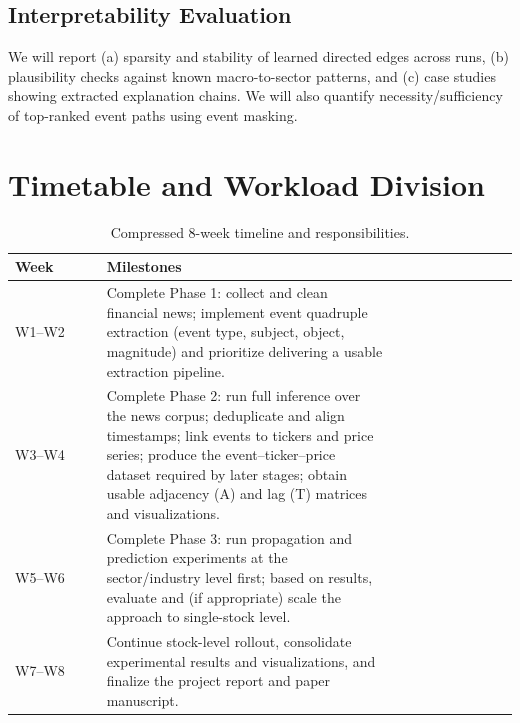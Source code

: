\documentclass[sigconf,review]{acmart}
\begin{document}
\subsection{Interpretability Evaluation}
We will report (a) sparsity and stability of learned directed edges across runs, (b) plausibility checks against known macro-to-sector patterns, and (c) case studies showing extracted explanation chains. We will also quantify necessity/sufficiency of top-ranked event paths using event masking.

\section{Timetable and Workload Division}
\begin{table}[H]
\centering
\caption{Compressed 8-week timeline and responsibilities.}
\begin{tabular}{@{}p{0.18\linewidth}p{0.58\linewidth}p{0.24\linewidth}@{}}
\toprule
\textbf{Week} & \textbf{Milestones}\\
\midrule
W1--W2 & Complete Phase 1: collect and clean financial news; implement event quadruple extraction (event type, subject, object, magnitude) and prioritize delivering a usable extraction pipeline.\\
W3--W4 & Complete Phase 2: run full inference over the news corpus; deduplicate and align timestamps; link events to tickers and price series; produce the event–ticker–price dataset required by later stages; obtain usable adjacency (A) and lag (T) matrices and visualizations. \\
W5--W6 & Complete Phase 3: run propagation and prediction experiments at the sector/industry level first; based on results, evaluate and (if appropriate) scale the approach to single-stock level. \\
W7--W8 & Continue stock-level rollout, consolidate experimental results and visualizations, and finalize the project report and paper manuscript. \\
\bottomrule
\end{tabular}
\label{tab:timetable}
\end{table}



\end{document}
